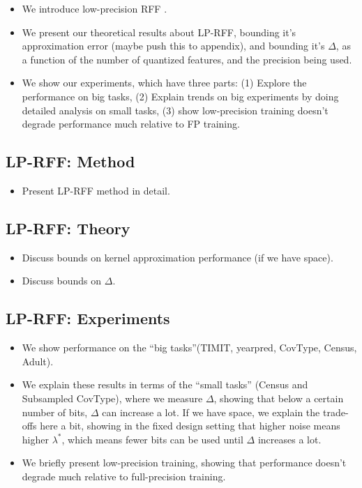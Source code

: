 \begin{itemize}
	\item We introduce low-precision RFF .
	\item We present our theoretical results about LP-RFF, bounding it's approximation error (maybe push this to appendix), and bounding it's $\Delta$, as a function of the number of quantized features, and the precision being used.
	\item We show our experiments, which have three parts: (1) Explore the performance on big tasks, (2) Explain trends on big experiments by doing detailed analysis on small tasks, (3) show low-precision training doesn't degrade performance much relative to FP training.
\end{itemize}

\subsection{LP-RFF: Method}
\begin{itemize}
	\item Present LP-RFF method in detail.
\end{itemize}
\subsection{LP-RFF: Theory}
\begin{itemize}
	\item Discuss bounds on kernel approximation performance (if we have space).
	\item Discuss bounds on $\Delta$.
\end{itemize}
\subsection{LP-RFF: Experiments}
\begin{itemize}
	\item We show performance on the ``big tasks''(TIMIT, yearpred, CovType, Census, Adult).
	\item We explain these results in terms of the ``small tasks'' (Census and Subsampled CovType), where we measure $\Delta$, showing that below a certain number of bits, $\Delta$ can increase a lot.  If we have space, we explain the trade-offs here a bit, showing in the fixed design setting that higher noise means higher $\lambda^*$, which means fewer bits can be used until $\Delta$ increases a lot.
	\item We briefly present low-precision training, showing that performance doesn't degrade much relative to full-precision training.
\end{itemize}